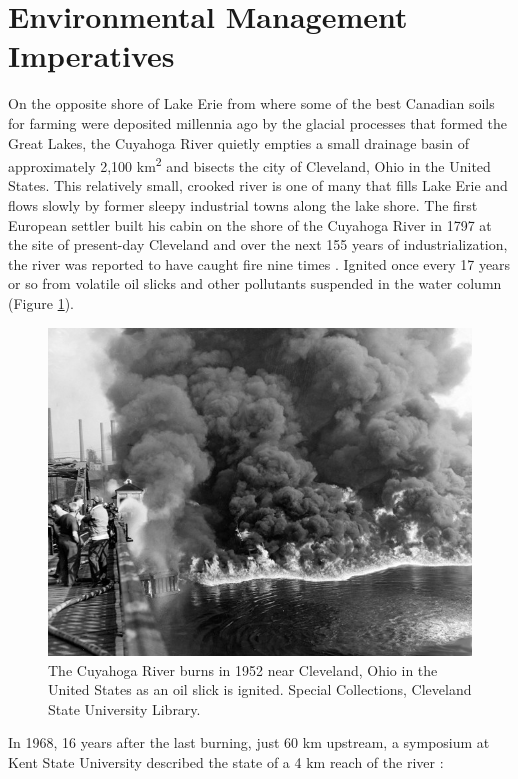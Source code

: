 \documentclass[
]{book}
\begin{document}
\hypertarget{environmental-management-imperatives}{%
\section{Environmental Management Imperatives}\label{environmental-management-imperatives}}

On the opposite shore of Lake Erie from where some of the best Canadian soils for farming were deposited millennia ago by the glacial processes that formed the Great Lakes, the Cuyahoga River quietly empties a small drainage basin of approximately 2,100 km\textsuperscript{2} and bisects the city of Cleveland, Ohio in the United States. This relatively small, crooked river is one of many that fills Lake Erie and flows slowly by former sleepy industrial towns along the lake shore. The first European settler built his cabin on the shore of the Cuyahoga River in 1797 at the site of present-day Cleveland and over the next 155 years of industrialization, the river was reported to have caught fire nine times \citep{la_bella_not_2009}. Ignited once every 17 years or so from volatile oil slicks and other pollutants suspended in the water column (Figure \ref{fig:1-Cuyahoga-River-fire-1952}).

\begin{figure}
\includegraphics[width=0.75\linewidth]{images/01-Cuyahoga-River-fire-1952} \caption{The Cuyahoga River burns in 1952 near Cleveland, Ohio in the United States as an oil slick is ignited. Special Collections, Cleveland State University Library.}\label{fig:1-Cuyahoga-River-fire-1952}
\end{figure}

In 1968, 16 years after the last burning, just 60 km upstream, a symposium at Kent State University described the state of a 4 km reach of the river \citep{kent_state_university_cuyahoga_1968}:
\end{document}
